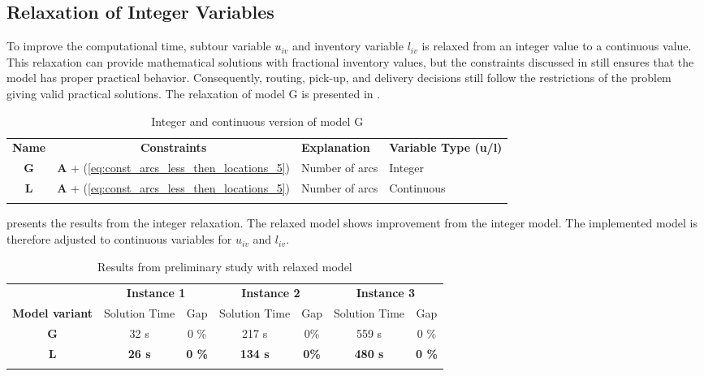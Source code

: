 \subsection{Relaxation of Integer Variables}\label{prelim_int_var_relax}

To improve the computational time, subtour variable $u_{iv}$ and inventory variable $l_{iv}$ is relaxed from an integer value to a continuous value. This relaxation can provide mathematical solutions with fractional inventory values, but the constraints discussed in  still ensures that the model has proper practical behavior. Consequently, routing, pick-up, and delivery decisions still follow the restrictions of the problem giving valid practical solutions. The relaxation of model G is presented in . 
\\
\begin{table}[H]
    \centering
    \caption{Integer and continuous version of model G}
    \begin{tabular}{c c l l}
        \thickhline
        \textbf{Name} & \textbf{Constraints} & \textbf{Explanation} & \textbf{Variable Type (u/l)}\\
        \thickhline
        \textbf{G} & \textbf{A} + (\ref{eq:const_arcs_less_then_locations_5}) & Number of arcs & Integer\\
        \textbf{L} & \textbf{A} + (\ref{eq:const_arcs_less_then_locations_5}) & Number of arcs & Continuous\\
        \thickhline
        \end{tabular}
    \label{variants_integer_relax_preliminary}
\end{table}

 presents the results from the integer relaxation. The relaxed model shows improvement from the integer model. The implemented model is therefore adjusted to continuous variables for $u_{iv}$ and $l_{iv}$. 
\\
\begin{table}[H]
    \centering
    \caption{Results from preliminary study with relaxed model}
    \begin{tabular}{c c c c c c c}
        \thickhline
         & \multicolumn{2}{c}{\textbf{Instance 1}} & \multicolumn{2}{c}{\textbf{Instance 2}} & \multicolumn{2}{c}{\textbf{Instance 3}}  \\
        \thickhline
        \textbf{Model variant} & Solution Time & Gap & Solution Time & Gap & Solution Time & Gap \\
        \hline
        \textbf{G} & 32 s & 0 \% & 217 s & 0\% & 559 s & 0 \% \\
        \textbf{L} & \textbf{26 s} & \textbf{0 \%} & \textbf{134 s} & \textbf{0\%} & \textbf{480 s} & \textbf{0 \%} \\
        \thickhline
        \end{tabular}
    \label{results_integer_relax_preliminary}
\end{table}


